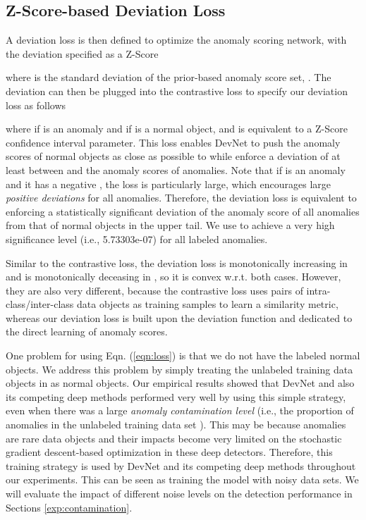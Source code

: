 \documentclass[sigconf]{acmart}
\begin{document}
\subsection{Z-Score-based Deviation Loss}\label{sec:loss}

A deviation loss is then defined to optimize the anomaly scoring network, with the deviation specified as a Z-Score

where  is the standard deviation of the prior-based anomaly score set, . The deviation can then be plugged into the contrastive loss \cite{hadsell2006contrastloss} to specify our deviation loss as follows

where  if  is an anomaly and  if  is a normal object, and  is equivalent to a Z-Score confidence interval parameter. This loss enables DevNet to push the anomaly scores of normal objects as close as possible to  while enforce a deviation of at least  between  and the anomaly scores of anomalies. Note that if  is an anomaly and it has a negative , the loss is particularly large, which encourages large \textit{positive deviations} for all anomalies. Therefore, the deviation loss is equivalent to enforcing a statistically significant deviation of the anomaly score of all anomalies from that of normal objects in the upper tail. We use  to achieve a very high significance level (i.e., 5.73303e-07) for all labeled anomalies. 

Similar to the contrastive loss, the deviation loss is monotonically increasing in  and is monotonically deceasing in , so it is convex w.r.t. both cases. However, they are also very different, because the contrastive loss uses pairs of intra-class/inter-class data objects as training samples to learn a similarity metric, whereas our deviation loss is built upon the deviation function and dedicated to the direct learning of anomaly scores.

One problem for using Eqn. (\ref{eqn:loss}) is that we do not have the labeled normal objects. We address this problem by simply treating the unlabeled training data objects in  as normal objects. Our empirical results showed that DevNet and also its competing deep methods performed very well by using this simple strategy, even when there was a large \textit{anomaly contamination level} (i.e., the proportion of anomalies in the unlabeled training data set ). This may be because anomalies are rare data objects and their impacts become very limited on the stochastic gradient descent-based optimization in these deep detectors. Therefore, this training strategy is used by DevNet and its competing deep methods throughout our experiments. This can be seen as training the model with noisy data sets. We will evaluate the impact of different noise levels on the detection performance in Sections \ref{exp:contamination}.
\end{document}
